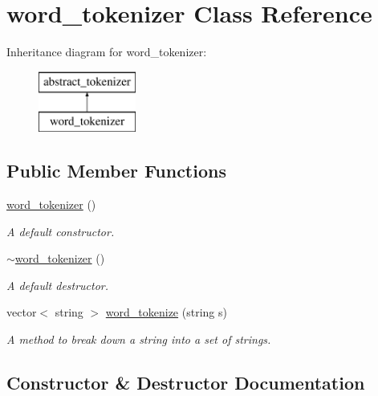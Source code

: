 \hypertarget{classword__tokenizer}{}\section{word\+\_\+tokenizer Class Reference}
\label{classword__tokenizer}
Inheritance diagram for word\+\_\+tokenizer\+:\begin{figure}[H]
\begin{center}
\leavevmode
\includegraphics[height=2.000000cm]{classword__tokenizer}
\end{center}
\end{figure}
\subsection*{Public Member Functions}
\begin{DoxyCompactItemize}
\item 
\hyperlink{classword__tokenizer_a30887805b70d364fb6fde6cdd814c16a}{word\+\_\+tokenizer} ()
\begin{DoxyCompactList}\small\item\em A default constructor. \end{DoxyCompactList}\item 
\mbox{\label{classword__tokenizer_a19a17890aac719ba8cb1459713f5a96e}} 
\hyperlink{classword__tokenizer_a19a17890aac719ba8cb1459713f5a96e}{$\sim$word\+\_\+tokenizer} ()
\begin{DoxyCompactList}\small\item\em A default destructor. \end{DoxyCompactList}\item 
vector$<$ string $>$ \hyperlink{classword__tokenizer_a4a77b2c08a636c15935a5c9dbd0d1d4f}{word\+\_\+tokenize} (string s)
\begin{DoxyCompactList}\small\item\em A method to break down a string into a set of strings. \end{DoxyCompactList}\end{DoxyCompactItemize}


\subsection{Constructor \& Destructor Documentation}
\mbox{\label{classword__tokenizer_a30887805b70d364fb6fde6cdd814c16a}} 
